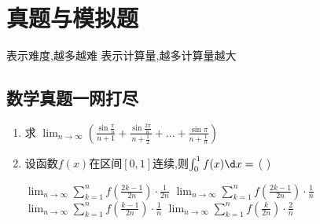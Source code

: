 \documentclass[12pt, a4paper, oneside, UTF8]{ctexbook}
\begin{document}
% 
\else
\fi
\chapter{真题与模拟题}

\begin{tcolorbox}[title=备注]
    \bt 表示难度,越多越难
    \bl 表示计算量,越多计算量越大
\end{tcolorbox}

\section{数学真题一网打尽} 
\begin{enumerate}
    \item \bt[2] 求 $ \lim_{n\to\infty}\left(\frac{\sin\frac{\pi}{n}}{n+1}+
    \frac{\sin\frac{2\pi}{n}}{n+\frac{1}{2}}+\ldots+\frac{\sin\pi}{n+\frac{1}{n}}\right)$ 

    
    \item \bt[2] 设函数$f(x)$在区间$\left[0,1\right]$连续,则$\int_{0}^{1}f(x)\d x = $ (   )
    \begin{choices}[2]
        \task $\lim_{n\to\infty}\sum_{k=1}^{n}f\left(\frac{2k-1}{2n}\right)\cdot\frac{1}{2n}$ 
        \task $\lim_{n\to\infty}\sum_{k=1}^{n}f\left(\frac{2k-1}{2n}\right)\cdot\frac{1}{n}$
        \task $\lim_{n\to\infty}\sum_{k=1}^{n}f\left(\frac{k-1}{2n}\right)\cdot\frac{1}{n}$
        \task $\lim_{n\to\infty}\sum_{k=1}^{n}f\left(\frac{k}{2n}\right)\cdot\frac{2}{n}$
    \end{choices}



\end{enumerate}
\end{document}
